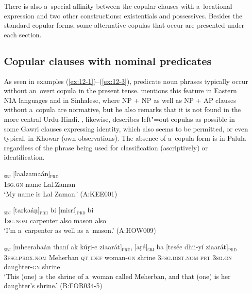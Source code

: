 There is also a~special affinity between the copular clauses with a~locational expression and two other constructions: existentials and possessives. Besides the standard copular forms, some alternative copulas that occur are presented under each section.


\subsection{Copular clauses with nominal predicates}
\label{subsec:12-1-1}


As seen in examples (\ref{ex:12-1})--(\ref{ex:12-3}), predicate noun phrases typically occur without an~overt copula in the present tense. \citet[337]{masica1991} mentions this feature in Eastern NIA languages and in Sinhalese, where NP + NP as well as NP + AP clauses without a~copula are normative, but he also remarks that it is not found in the more central Urdu-Hindi. \citet[118--122]{baart1999a}, likewise, describes left"=out copulas as possible in some Gawri clauses expressing identity, which also seems to be permitted, or even typical, in Khowar (own observations). The absence of a~copula form is in Palula regardless of the phrase being used for classification (ascriptively) or identification. 

\begin{exe}
\ex
\label{ex:12-1}
\textsubscript{\textsc{sbj}} [laalzamaán]\textsubscript{\textsc{prd}} \\
\textsc{1sg.gn} name Lal.Zaman  \\
\glt `My name is Lal Zaman.' (A:KEE001)
\end{exe}
\begin{exe}
\ex
\label{ex:12-2}
\gll [ma]\textsubscript{\textsc{sbj}} [tarkaáṇ]\textsubscript{\textsc{prd}} bi
     [misrí]\textsubscript{\textsc{prd}} bi \\
\textsc{1sg.nom} carpenter also mason also  \\
\glt `I'm a~carpenter as well as a~mason.' (A:HOW009)

\ex
\label{ex:12-3}
\gll [aní]\textsubscript{\textsc{sbj}} [mheerabaán thaní ak kúṛi-e ziaarát]\textsubscript{\textsc{prd}}, [aṛé]\textsubscript{\textsc{sbj}} ba [tesée dhii-yí ziaarát]\textsubscript{\textsc{prd}} \\
\textsc{3fsg.prox.nom} Meherban \textsc{qt} \textsc{idef} woman-\textsc{gn}  shrine \textsc{3fsg.dist.nom} \textsc{prt} \textsc{3sg.gn} daughter-\textsc{gn}  shrine \\
\glt `This (one) is the shrine of a~woman called Meherban, and that (one) is her daughter's shrine.' (B:FOR034-5)
\end{exe}

